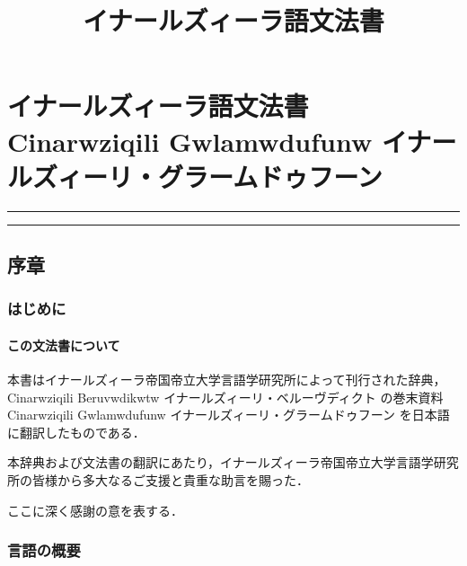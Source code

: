 \documentclass[
  japanese,
]{article}
\title{イナールズィーラ語文法書}
\author{}
\date{}
\begin{document}
\maketitle

{
\setcounter{tocdepth}{3}
\tableofcontents
}
\section{\texorpdfstring{イナールズィーラ語文法書\\
{Cinarwziqili Gwlamwdufunw}
イナールズィーリ・グラームドゥフーン}{イナールズィーラ語文法書 Cinarwziqili Gwlamwdufunw イナールズィーリ・グラームドゥフーン}}\label{ux30a4ux30caux30fcux30ebux30baux30a3ux30fcux30e9ux8a9eux6587ux6cd5ux66f8-cinarwziqili-gwlamwdufunw-ux30a4ux30caux30fcux30ebux30baux30a3ux30fcux30eaux30b0ux30e9ux30fcux30e0ux30c9ux30a5ux30d5ux30fcux30f3}

\begin{center}\rule{0.5\linewidth}{0.5pt}\end{center}

\begin{center}\rule{0.5\linewidth}{0.5pt}\end{center}

\subsection{序章}\label{chapter1}

\subsubsection{はじめに}\label{section1.1}

\paragraph{この文法書について}\label{subsection1.1.1}

本書はイナールズィーラ帝国帝立大学言語学研究所によって刊行された辞典，{Cinarwziqili
Beruvwdikwtw} イナールズィーリ・ベルーヴディクト の巻末資料{Cinarwziqili
Gwlamwdufunw} イナールズィーリ・グラームドゥフーン
を日本語に翻訳したものである．

本辞典および文法書の翻訳にあたり，イナールズィーラ帝国帝立大学言語学研究所の皆様から多大なるご支援と貴重な助言を賜った．

ここに深く感謝の意を表する．

\subsubsection{言語の概要}\label{section1.2}
\end{document}
